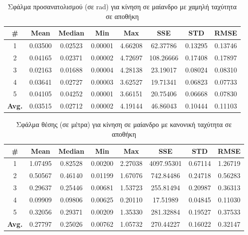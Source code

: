 \begin{table}[H]
    \centering
    \caption{Σφάλμα προσανατολισμού (σε rad) για κίνηση σε μαίανδρο με χαμηλή ταχύτητα σε αποθήκη}
    \label{tab:orientation_error_meander_slow_warehouse}
    \begin{tabular}{| c | c | c | c | c | c | c | c | }
        \hline
        \rowcolor{Gray}
        \# & Mean & Median & Min & Max & SSE & STD & RMSE \\
        \hline
        1 & 0.03500 & 0.02523 & 0.00001 & 4.66208 & 62.37786 & 0.13295 & 0.13746 \\
        2 & 0.04165 & 0.02371 & 0.00002 & 4.72697 & 108.26666 & 0.17408 & 0.17897 \\
        3 & 0.02163 & 0.01688 & 0.00004 & 4.28138 & 23.19017 & 0.08024 & 0.08310 \\
        4 & 0.03641 & 0.02727 & 0.00003 & 3.62527 & 19.71341 & 0.06823 & 0.07733 \\
        5 & 0.04105 & 0.04252 & 0.00001 & 3.66151 & 20.75406 & 0.06668 & 0.07830 \\
        \hline
        \textbf{Avg.} & 0.03515 & 0.02712 & 0.00002 & 4.19144 & 46.86043 & 0.10444 & 0.11103 \\
        \hline
    \end{tabular}
\end{table}

\begin{table}[H]
    \begin{center}
        \centering
        \caption{Σφάλμα θέσης (σε μέτρα) για κίνηση σε μαίανδρο με κανονική ταχύτητα σε αποθήκη}
        \label{tab:position_error_meander_normal_warehouse}
        \begin{tabular}{| c | c | c | c | c | c | c | c | }
        \hline
        \rowcolor{Gray}
        \# & Mean & Median & Min & Max & SSE & STD & RMSE \\
        \hline
        1 & 1.07495 & 0.82528 & 0.00200 & 2.27038 & 4097.95301 & 0.67114 & 1.26719 \\
        2 & 0.50567 & 0.46140 & 0.01199 & 1.67076 & 742.84486 & 0.24718 & 0.56283 \\
        3 & 0.29637 & 0.25446 & 0.00681 & 1.53723 & 255.81494 & 0.20987 & 0.36313 \\
        4 & 0.09909 & 0.09806 & 0.00625 & 0.20110 & 17.51989 & 0.04845 & 0.11030 \\
        5 & 0.32056 & 0.29371 & 0.00209 & 1.35330 & 281.32884 & 0.19527 & 0.37533 \\
        \hline
        \textbf{Avg.} & 0.27797 & 0.25026 & 0.00762 & 1.05732 & 270.44227 & 0.16022 & 0.32147\\
        \hline
        \end{tabular}
    \end{center}
\end{table}

